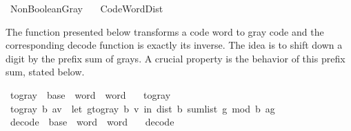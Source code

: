 %
\begin{isabellebody}%
%
%
\isadelimdocument
%
\endisadelimdocument
%
\isatagdocument
%
\isamarkuptrue%
%
\endisatagdocument
{\isafolddocument}%
%
\isadelimdocument
%
\endisadelimdocument
%
\isadelimtheory
%
\endisadelimtheory
%
\isatagtheory
{}\isamarkupfalse%
\ Non{\isacharunderscore}{\kern0pt}Boolean{\isacharunderscore}{\kern0pt}Gray\isanewline
\ \ \ Code{\isacharunderscore}{\kern0pt}Word{\isacharunderscore}{\kern0pt}Dist\isanewline
{}%
\endisatagtheory
{\isafoldtheory}%
%
\isadelimtheory
%
\endisadelimtheory
%
\begin{isamarkuptext}%
The function presented below transforms a code word to gray code
  and the corresponding decode function is exactly its inverse.
The idea is to shift down a digit by the prefix sum of grays.
A crucial property is the behavior of this prefix sum, stated below.%
\end{isamarkuptext}\isamarkuptrue%
\isamarkupfalse%
\ to{\isacharunderscore}{\kern0pt}gray\ {\isacharcolon}{\kern0pt}{\isacharcolon}{\kern0pt}\ {\isachardoublequoteopen}base\ {\isasymRightarrow}\ word\ {\isasymRightarrow}\ word{\isachardoublequoteclose}\ \isanewline
\ \ {\isachardoublequoteopen}to{\isacharunderscore}{\kern0pt}gray\ {\isacharunderscore}{\kern0pt}\ {\isacharbrackleft}{\kern0pt}{\isacharbrackright}{\kern0pt}\ {\isacharequal}{\kern0pt}\ {\isacharbrackleft}{\kern0pt}{\isacharbrackright}{\kern0pt}{\isachardoublequoteclose}\isanewline
{\isacharbar}{\kern0pt}\ {\isachardoublequoteopen}to{\isacharunderscore}{\kern0pt}gray\ b\ {\isacharparenleft}{\kern0pt}a{\isacharhash}{\kern0pt}v{\isacharparenright}{\kern0pt}\ {\isacharequal}{\kern0pt}\ {\isacharparenleft}{\kern0pt}let\ g{\isacharequal}{\kern0pt}to{\isacharunderscore}{\kern0pt}gray\ b\ v\ in\ dist{}\ b\ {\isacharparenleft}{\kern0pt}sum{\isacharunderscore}{\kern0pt}list\ g\ mod\ b{\isacharparenright}{\kern0pt}\ a{\isacharhash}{\kern0pt}g{\isacharparenright}{\kern0pt}{\isachardoublequoteclose}\isanewline
\isanewline
{}\isamarkupfalse%
\ decode\ {\isacharcolon}{\kern0pt}{\isacharcolon}{\kern0pt}\ {\isachardoublequoteopen}base\ {\isasymRightarrow}\ word\ {\isasymRightarrow}\ word{\isachardoublequoteclose}\ \isanewline
\ \ {\isachardoublequoteopen}decode\ {\isacharunderscore}{\kern0pt}\ {\isacharbrackleft}{\kern0pt}{\isacharbrackright}{\kern0pt}\ {\isacharequal}{\kern0pt}\ {\isacharbrackleft}{\kern0pt}{\isacharbrackright}{\kern0pt}{\isachardoublequoteclose}\isanewline

\end{isabellebody}
